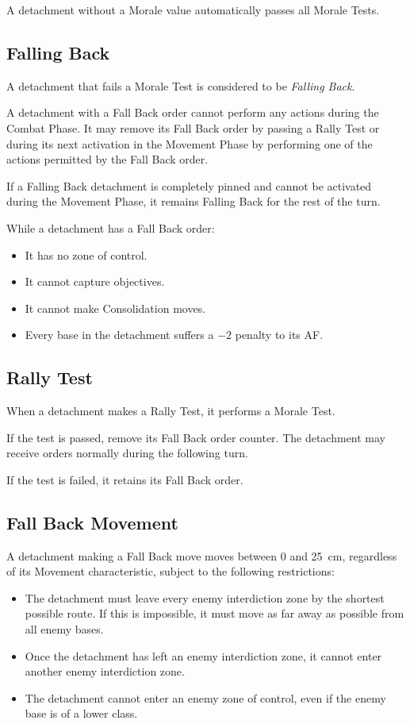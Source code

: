 A detachment without a Morale value automatically passes all Morale Tests.

\subsection{Falling Back}

A detachment that fails a Morale Test is considered to be \textit{Falling Back}.

A detachment with a Fall Back order cannot perform any actions during the Combat Phase. It may remove its Fall Back order by passing a Rally Test or during its next activation in the Movement Phase by performing one of the actions permitted by the Fall Back order.

If a Falling Back detachment is completely pinned and cannot be activated during the Movement Phase, it remains Falling Back for the rest of the turn.

While a detachment has a Fall Back order:

\begin{itemize}
    \item It has no zone of control.
    \item It cannot capture objectives.
    \item It cannot make Consolidation moves.
    \item Every base in the detachment suffers a $-2$ penalty to its AF.
\end{itemize}

\subsection{Rally Test}

When a detachment makes a Rally Test, it performs a Morale Test.

If the test is passed, remove its Fall Back order counter. The detachment may receive orders normally during the following turn.

If the test is failed, it retains its Fall Back order.

\subsection{Fall Back Movement}

A detachment making a Fall Back move moves between 0 and 25~cm, regardless of its Movement characteristic, subject to the following restrictions:

\begin{itemize}
    \item The detachment must leave every enemy interdiction zone by the shortest possible route. If this is impossible, it must move as far away as possible from all enemy bases.

    \item Once the detachment has left an enemy interdiction zone, it cannot enter another enemy interdiction zone.

    \item The detachment cannot enter an enemy zone of control, even if the enemy base is of a lower class.
\end{itemize}

